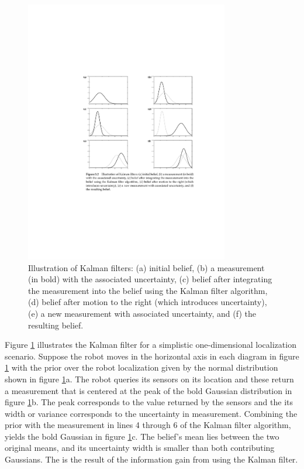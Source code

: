 \documentclass[conference]{IEEEtran}
\begin{document}
\begin{figure}[!t]
\centering
\includegraphics[width=3.5in]{./figures/KalmanIllustration.pdf}

\caption{Illustration of Kalman filters: (a) initial belief, (b) a measurement (in bold) with the associated uncertainty, (c) belief after integrating the measurement into the belief using the Kalman filter algorithm, (d) belief after motion to the right (which introduces uncertainty), (e) a new measurement with associated uncertainty, and (f) the resulting belief.}
\label{KalmanIllustration}
\end{figure}

Figure \ref{KalmanIllustration} illustrates the Kalman filter for a simplistic one-dimensional localization scenario. Suppose the robot moves in the horizontal axis in each diagram in figure \ref{KalmanIllustration} with the prior over the robot localization given by the normal distribution shown in figure \ref{KalmanIllustration}a. The robot queries its sensors on its location and these return a measurement that is centered at the peak of the bold Gaussian distribution in figure \ref{KalmanIllustration}b. The peak corresponds to the value returned by the sensors and the its width or variance corresponds to the uncertainty in measurement. Combining the prior with the measurement in lines 4 through 6 of the Kalman filter algorithm, yields the bold Gaussian in figure \ref{KalmanIllustration}c. The belief's mean lies between the two original means, and its uncertainty width is smaller than both contributing Gaussians. The is the result of the information gain from using the Kalman filter.\\
\end{document}
